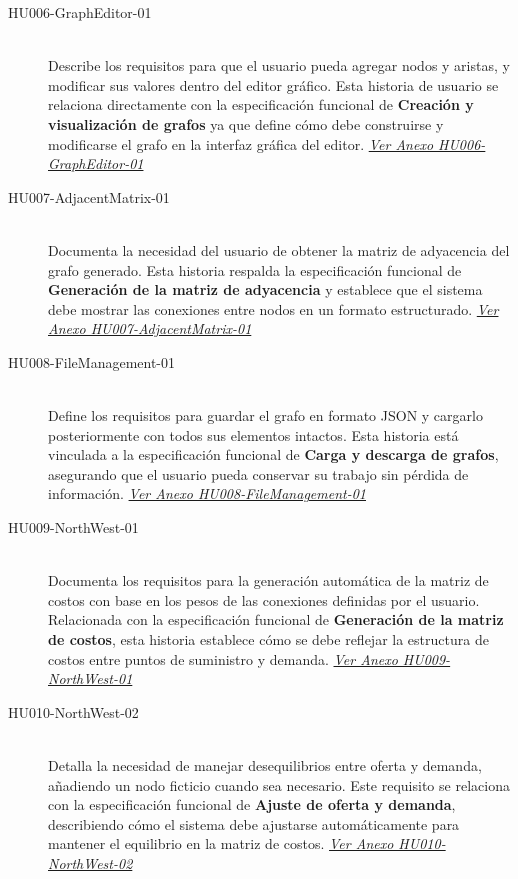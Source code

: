\documentclass[stu, 12pt, letterpaper, donotrepeattitle, floatsintext, natbib]{apa7}
\begin{document}
\begin{description}
    \item[HU006-GraphEditor-01] \hfill \\
    Describe los requisitos para que el usuario pueda agregar nodos y aristas, y modificar sus valores dentro del editor gráfico. Esta historia de usuario se relaciona directamente con la especificación funcional de \textbf{Creación y visualización de grafos} ya que define cómo debe construirse y modificarse el grafo en la interfaz gráfica del editor. \textit{\hyperref[tab:HU006-GraphEditor-01]{Ver Anexo HU006-GraphEditor-01}}

    \item[HU007-AdjacentMatrix-01] \hfill \\
    Documenta la necesidad del usuario de obtener la matriz de adyacencia del grafo generado. Esta historia respalda la especificación funcional de \textbf{Generación de la matriz de adyacencia} y establece que el sistema debe mostrar las conexiones entre nodos en un formato estructurado. \textit{\hyperref[tab:HU007-AdjacentMatrix-01]{Ver Anexo HU007-AdjacentMatrix-01}}

    \item[HU008-FileManagement-01] \hfill \\
    Define los requisitos para guardar el grafo en formato JSON y cargarlo posteriormente con todos sus elementos intactos. Esta historia está vinculada a la especificación funcional de \textbf{Carga y descarga de grafos}, asegurando que el usuario pueda conservar su trabajo sin pérdida de información. \textit{\hyperref[tab:HU008-FileManagement-01]{Ver Anexo HU008-FileManagement-01}}

    \item[HU009-NorthWest-01] \hfill \\
    Documenta los requisitos para la generación automática de la matriz de costos con base en los pesos de las conexiones definidas por el usuario. Relacionada con la especificación funcional de \textbf{Generación de la matriz de costos}, esta historia establece cómo se debe reflejar la estructura de costos entre puntos de suministro y demanda. \textit{\hyperref[tab:HU009-NorthWest-01]{Ver Anexo HU009-NorthWest-01}}

    \item[HU010-NorthWest-02] \hfill \\
    Detalla la necesidad de manejar desequilibrios entre oferta y demanda, añadiendo un nodo ficticio cuando sea necesario. Este requisito se relaciona con la especificación funcional de \textbf{Ajuste de oferta y demanda}, describiendo cómo el sistema debe ajustarse automáticamente para mantener el equilibrio en la matriz de costos. \textit{\hyperref[tab:HU010-NorthWest-02]{Ver Anexo HU010-NorthWest-02}}


\end{description}
\end{document}
